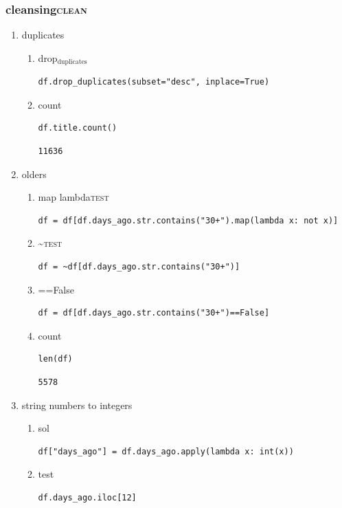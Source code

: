 \documentclass[11pt]{article}
\begin{document}
\subsubsection{cleansing\hfill{}\textsc{clean}}
\label{sec:orge1f14e8}
\begin{enumerate}
\item duplicates
\label{sec:org6af9c4a}
\begin{enumerate}
\item drop\(_{\text{duplicates}}\)
\label{sec:orgefd6bc8}
\begin{verbatim}
df.drop_duplicates(subset="desc", inplace=True)
\end{verbatim}

\item count
\label{sec:org9f70cc1}
\begin{verbatim}
df.title.count()
\end{verbatim}

\begin{verbatim}
11636
\end{verbatim}
\end{enumerate}

\item olders
\label{sec:org454309a}
\begin{enumerate}
\item map lambda\hfill{}\textsc{test}
\label{sec:org075854b}
\begin{verbatim}
df = df[df.days_ago.str.contains("30+").map(lambda x: not x)]
\end{verbatim}

\item \textasciitilde{}\hfill{}\textsc{test}
\label{sec:orgd0347a7}
\begin{verbatim}
df = ~df[df.days_ago.str.contains("30+")]
\end{verbatim}

\item ==False
\label{sec:org8b43d4b}
\begin{verbatim}
df = df[df.days_ago.str.contains("30+")==False]
\end{verbatim}

\item count
\label{sec:org1e597b8}
\begin{verbatim}
len(df)
\end{verbatim}

\begin{verbatim}
5578
\end{verbatim}
\end{enumerate}
\item string numbers to integers
\label{sec:org589ac1c}
\begin{enumerate}
\item sol
\label{sec:orgeb6c721}
\begin{verbatim}
df["days_ago"] = df.days_ago.apply(lambda x: int(x))
\end{verbatim}
\item test
\label{sec:orge122857}
\begin{verbatim}
df.days_ago.iloc[12]
\end{verbatim}


\end{enumerate}
\end{enumerate}
\end{document}
